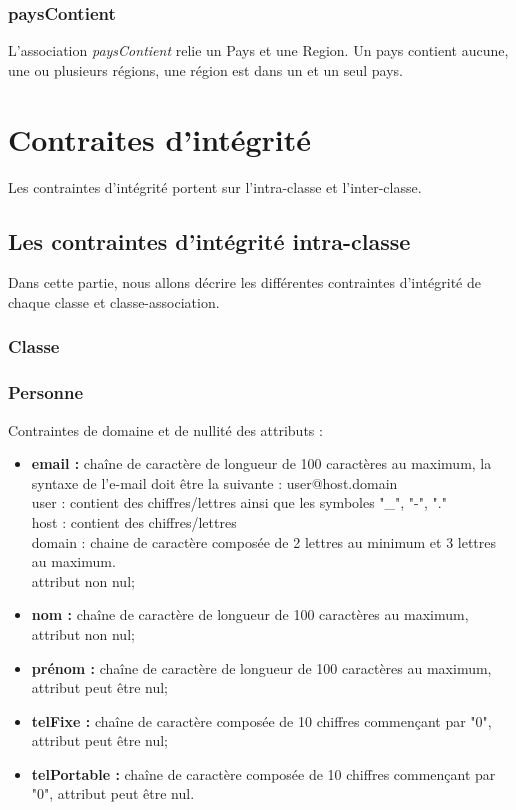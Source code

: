 \documentclass[asi, sansVersion]{picInsa}
\begin{document}
\subsection*{paysContient}

L'association \textit{paysContient} relie un Pays et une Region. Un pays contient aucune, une ou plusieurs régions, une région est dans un et un seul pays.

\chapter{Contraites d'intégrité}

Les contraintes d'intégrité portent sur l'intra-classe et l'inter-classe.

\section{Les contraintes d'intégrité intra-classe}
Dans cette partie, nous allons décrire les différentes contraintes d'intégrité de chaque classe et classe-association.

\subsection{Classe} 
 
\subsection*{Personne}
Contraintes de domaine et de nullité des attributs :
\begin{itemize}
	\item \textbf{email :} chaîne de caractère de longueur de 100 caractères au maximum, la syntaxe de l'e-mail doit être la suivante : user@host.domain\\
	user : contient des chiffres/lettres ainsi que les symboles "\_", "-", "." \\
	host : contient des chiffres/lettres \\
	domain : chaine de caractère composée de 2 lettres au minimum et 3 lettres au maximum. \\
	attribut non nul;  
 	\item \textbf{nom :} chaîne de caractère de longueur de 100 caractères au maximum, attribut non nul;
	\item \textbf{prénom :} chaîne de caractère de longueur de 100 caractères au maximum, attribut peut être nul;
	\item \textbf{telFixe :} chaîne de caractère composée de 10 chiffres commençant par "0", attribut peut être nul;
	\item \textbf{telPortable :} chaîne de caractère composée de 10 chiffres commençant par "0", attribut peut être nul.\\
\end{itemize}  
\end{document}
